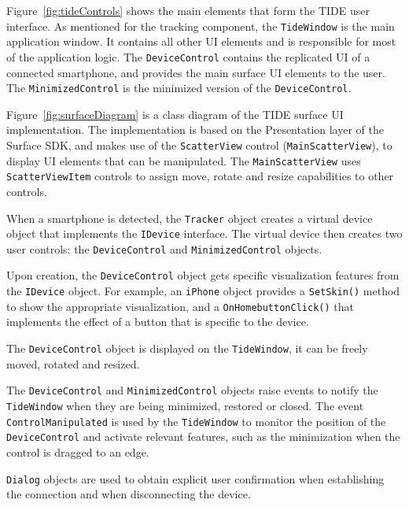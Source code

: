 Figure~\ref{fig:tideControls} shows the main elements that form the TIDE user interface.
As mentioned for the tracking component, the \texttt{TideWindow} is the main application window.
It contains all other UI elements and is responsible for most of the application logic.
The \texttt{DeviceControl} contains the replicated UI of a connected smartphone, and provides the main surface UI elements to the user.
The \texttt{MinimizedControl} is the minimized version of the \texttt{DeviceControl}.

Figure~\ref{fig:surfaceDiagram} is a class diagram of the TIDE surface UI implementation.
The implementation is based on the Presentation layer of the Surface SDK, and makes use of the \texttt{ScatterView} control (\texttt{MainScatterView}), to display UI elements that can be manipulated.
The \texttt{MainScatterView} uses \texttt{ScatterViewItem} controls to assign move, rotate and resize capabilities to other controls.

When a smartphone is detected, the \texttt{Tracker} object creates a virtual device object that implements the \texttt{IDevice} interface.
The virtual device then creates two user controls: the \texttt{DeviceControl} and \texttt{MinimizedControl} objects.

Upon creation, the \texttt{DeviceControl} object gets specific visualization features from the \texttt{IDevice} object.
For example, an \texttt{iPhone} object provides a \texttt{SetSkin()} method to show the appropriate visualization, and a \texttt{OnHomebuttonClick()} that implements the effect of a button that is specific to the device.

The \texttt{DeviceControl} object is displayed on the \texttt{TideWindow}, it can be freely moved, rotated and resized.

The \texttt{DeviceControl} and \texttt{MinimizedControl} objects raise events to notify the \texttt{TideWindow} when they are being minimized, restored or closed.
The event \texttt{ControlManipulated} is used by the \texttt{TideWindow} to monitor the position of the \texttt{DeviceControl} and activate relevant features, such as the minimization when the control is dragged to an edge.

\texttt{Dialog} objects are used to obtain explicit user confirmation when establishing the connection and when disconnecting the device.




